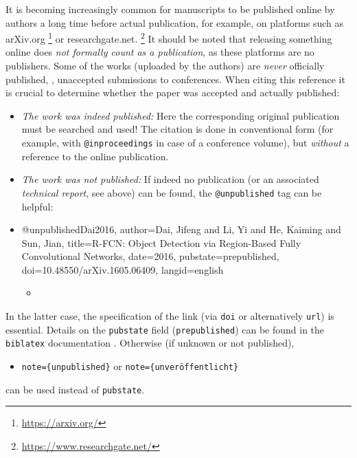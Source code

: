 It is becoming increasingly common for manuscripts to be published online by
authors a long time before actual publication, for example, on platforms such as
\textsf{arXiv.org}%
\footnote{\url{https://arxiv.org/}}
or \textsf{researchgate.net}.%
\footnote{\url{https://www.researchgate.net/}}
It should be noted that releasing something online does \emph{not formally
count as a publication}, as these platforms are no publishers. Some of the
works (uploaded by the authors) are \emph{never} officially published, \eg,
unaccepted submissions to conferences. When citing this reference it is crucial
to determine whether the paper was accepted and actually published:
%
\begin{itemize}
\item[a)]
\emph{The work was indeed published:} Here the corresponding original
publication must be searched and used! The citation is done in conventional form
(for example, with \texttt{@inproceedings} in case of a conference volume), but
\emph{without} a reference to the online publication.
\item[b)]
\emph{The work was \emph{not} published:} If indeed no publication (or an
associated \emph{technical report}, see above) can be found, the
\texttt{@unpublished} tag can be helpful:
\item %
\begin{GenericCode}[numbers=none]
@unpublished{Dai2016,
  author={Dai, Jifeng and Li, Yi and He, Kaiming and Sun, Jian},
  title={{R-FCN:} Object Detection via Region-Based Fully Convolutional Networks},
  date={2016},
  pubstate={prepublished},
  doi={10.48550/arXiv.1605.06409},
  langid={english}
}
\end{GenericCode}
\begin{itemize}
\item[\cite{Dai2016}] 
\end{itemize}
%
\end{itemize}
%
In the latter case, the specification of the link (via \texttt{doi} or alternatively
\texttt{url}) is essential. Details on the \texttt{pubstate} field
(\texttt{prepublished}) can be found in the \texttt{biblatex} documentation
\cite[Sec.\ 4.9.2.11]{Kime2026}. Otherwise (if unknown or not published),
%
\begin{itemize}
\item[]\texttt{note=\{unpublished\}} \quad or
   \quad \texttt{note=\{unveröffentlicht\}}
\end{itemize}
%
can be used instead of \texttt{pubstate}.


